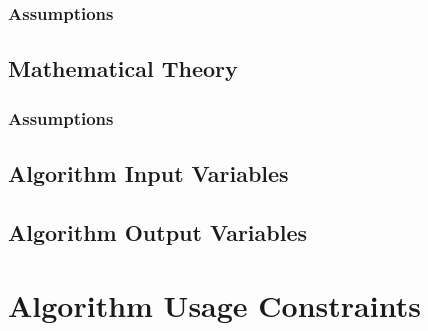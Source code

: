 \subsubsection{Assumptions}
\ScientificTheoryAssumptions

\subsection{Mathematical Theory}
\MathematicalTheory

\subsubsection{Assumptions}
\MathematicalTheoryAssumptions

\subsection{Algorithm Input Variables}
\AlgorithmInputVariables

\subsection{Algorithm Output Variables}
\AlgorithmOutputVariables

\section{Algorithm Usage Constraints}
\AlgorithmUsageConstraints





  